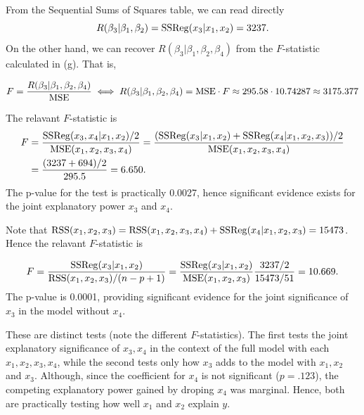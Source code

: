\documentclass{homework}
\begin{document}
\begin{longproblem}

From the Sequential Sums of Squares table, we can read directly
$$
  R(\beta_3|\beta_1,\beta_2) = \mathrm{SSReg}(x_3|x_1,x_2) = 3237.
$$
On the other hand, we can recover $R(\beta_3|\beta_1,\beta_2,\beta_4)$ from the
$F$-statistic calculated in (g). That is, 

$$
F = \frac{R(\beta_3|\beta_1,\beta_2,\beta_4)}{\mathrm{MSE}} \iff R(\beta_3|\beta_1,\beta_2,\beta_4) = \mathrm{MSE}\cdot F \approx 295.58\cdot10.74287\approx3175.377
$$

\newpage
{}

The relavant $F$-statistic is
\begin{align*}
  F &= \frac{\mathrm{SSReg}(x_3,x_4|x_1,x_2)/2}{\mathrm{MSE}(x_1,x_2,x_3,x_4)}= \frac{(\mathrm{SSReg}(x_3|x_1,x_2) + \mathrm{SSReg}(x_4|x_1,x_2,x_3))/2}{\mathrm{MSE}(x_1,x_2,x_3,x_4)} \\
  &= \frac{(3237 + 694)/2}{295.5} = 6.650.
\end{align*}
The p-value for the test is practically 0.0027, hence significant evidence exists for the joint explanatory power $x_3$ and $x_4$.  


Note that $\mathrm{RSS}(x_1,x_2,x_3) = \mathrm{RSS}(x_1,x_2,x_3,x_4) + \mathrm{SSReg}(x_4|x_1,x_2,x_3) = 15473$.  Hence the relavant $F$-statistic is

$$
  F = \frac{\mathrm{SSReg}(x_3|x_1,x_2)}{\mathrm{RSS}(x_1,x_2,x_3)/(n-p+1)} = \frac{\mathrm{SSReg}(x_3|x_1,x_2)}{\mathrm{MSE}(x_1,x_2,x_3)}  \frac{3237/2}{15473/51} = 10.669.
$$
The p-value is 0.0001,  providing significant evidence for the joint significance of $x_3$ in the model without $x_4$.


These are distinct tests (note the different $F$-statistics). The first tests the joint explanatory significance of
$x_3,x_4$ in the context of the full model with each $x_1,x_2,x_3,x_4$,
while the second tests only how $x_3$ adds to the model with $x_1,x_2$ and $x_3$.  Although, since the coefficient for $x_4$ is not significant ($p = .123$), the competing explanatory power gained by droping $x_4$ was marginal. Hence, both are practically testing how well $x_1$ and $x_2$ explain $y$.



\end{longproblem}
\end{document}
